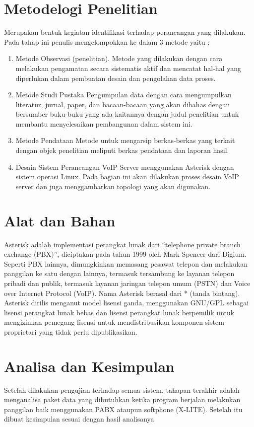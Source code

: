 \documentclass{jtetiproposalskripsi}
\begin{document}
\section{Metodelogi Penelitian}
Merupakan bentuk kegiatan identifikasi terhadap perancangan yang dilakukan.
Pada tahap ini penulis mengelompokkan ke dalam 3 metode yaitu :
\begin{enumerate}
\item Metode Observasi (penelitian).
\newline Metode yang dilakukan dengan cara melakukan pengamatan secara sistematis aktif dan mencatat hal-hal yang diperlukan dalam pembuatan desain dan pengolahan data proses.
\item Metode Studi Pustaka 
\newline Pengumpulan data dengan cara mengumpulkan literatur, jurnal, paper, dan bacaan-bacaan yang akan dibahas dengan bersumber buku-buku yang ada kaitannya dengan judul penelitian untuk membantu menyelesaikan pembangunan dalam sistem ini.
\item Metode Pendataan 
\newline Metode untuk mengarsip berkas-berkas yang terkait dengan objek penelitian meliputi berkas pendataan dan laporan hasil.
\item Desain Sistem 
\newline Perancangan VoIP Server menggunakan Asterisk dengan sistem operasi Linux. Pada bagian ini akan dilakukan proses desain VoIP server dan juga menggambarkan topologi yang akan digunakan.
\end{enumerate}
\section{Alat dan Bahan}
Asterisk adalah implementasi perangkat lunak dari “telephone private branch exchange (PBX)”, diciptakan pada tahun 1999 oleh Mark Spencer dari Digium. Seperti PBX lainnya, dimungkinkan memasang pesawat telepon dan melakukan panggilan ke satu dengan lainnya, termasuk tersambung ke layanan telepon pribadi dan publik, termasuk layanan jaringan telepon umum (PSTN) dan Voice over Internet Protocol (VoIP). Nama Asterisk berasal dari * (tanda bintang). Asterisk dirilis menganut model lisensi ganda, menggunakan GNU/GPL sebagai lisensi perangkat lunak bebas dan lisensi perangkat lunak berpemilik untuk mengizinkan pemegang lisensi untuk mendistribusikan komponen sistem proprietari yang tidak perlu dipublikasikan.

\section{Analisa dan Kesimpulan}
Setelah dilakukan pengujian terhadap semua sistem, tahapan terakhir adalah menganalisa paket data yang dibutuhkan ketika program berjalan melakukan panggilan baik menggunakan PABX ataupun softphone (X-LITE). Setelah itu dibuat kesimpulan sesuai dengan hasil analisanya
\end{document}
